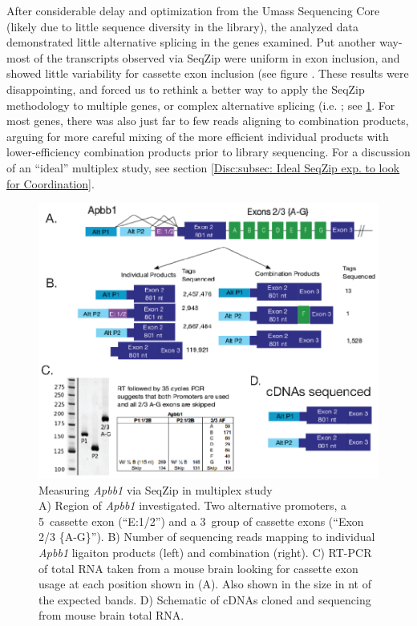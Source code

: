   After considerable delay and optimization from the Umass Sequencing Core (likely due to little sequence diversity in the library), the analyzed data demonstrated little alternative splicing in the genes examined. Put another way- most of the transcripts observed via SeqZip were uniform in exon inclusion, and showed little variability for cassette exon inclusion (see figure . These results were disappointing, and forced us to rethink a better way to apply the SeqZip methodology to multiple genes, or complex alternative splicing (i.e. \dscam{}; see \ref{SeqZipMethod:fig:Apbb1 Results}. For most genes, there was also just far to few reads aligning to combination products, arguing for more careful mixing of the more efficient individual products with lower-efficiency combination products prior to library sequencing. For a discussion of an ``ideal'' multiplex study, see section \ref{Disc:subsec: Ideal SeqZip exp. to look for Coordination}.

  \begin{figure} %
    \centering 
    \includegraphics{Figures/SeqZipMethod/Apbb1.eps}
    \caption[Measuring \textit{Apbb1} via SeqZip in multiplex study]
    {
      Measuring \textit{Apbb1} via SeqZip in multiplex study\\[0.25cm]
      A) Region of \textit{Apbb1} investigated. Two alternative promoters, a 5\textprime~cassette exon (``E:1/2'') and a 3\textprime~group of cassette exons (``Exon 2/3 \{A-G\}''). B) Number of sequencing reads mapping to individual \textit{Apbb1} ligaiton products (left) and combination (right). C) RT-PCR of total RNA taken from a mouse brain looking for cassette exon usage at each position shown in (A). Also shown in the size in nt of the expected bands. D) Schematic of cDNAs cloned and sequencing from mouse brain total RNA.
      }
    \label{SeqZipMethod:fig:Apbb1 Results}
    \end{figure}

